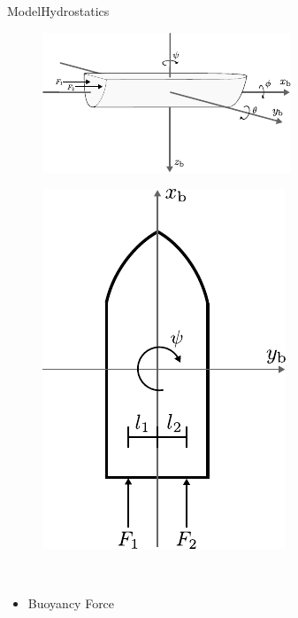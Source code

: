 \begin{frame}{Model}{Hydrostatics}
    \begin{minipage}{0.65\linewidth}
        \begin{figure}[H]
            \centering
            \includegraphics[width=1\linewidth]{figures/boat3DForces}
        \end{figure}        
    \end{minipage}\hfill      
    \begin{minipage}{0.3\linewidth}
        \begin{figure}[H]
            \centering
            \includegraphics[width=0.7\linewidth]{figures/boat2D}
        \end{figure}                
    \end{minipage}\hfill \\
    \begin{itemize}
        \item Buoyancy Force
    \end{itemize}
\end{frame}

